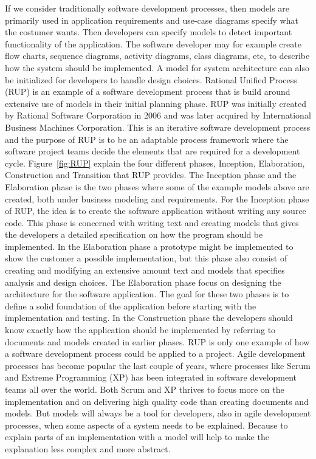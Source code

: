 If we consider traditionally software development processes, then models are
primarily used in application requirements and use-case diagrams specify what 
the costumer wants. Then developers can specify models to detect important
functionality of the application. The software developer may for example create
flow charts, sequence diagrams, activity diagrams, class diagrams, etc, to
describe how the system should be implemented. A model for system architecture
can also be initialized for developers to handle design choices. Rational
Unified Process\cite{Rational1998} (RUP) is an example of a software
development process that is build around extensive use of models in their
initial planning phase. RUP was initially created by Rational Software
Corporation\cite{IBMRational} in 2006 and was later acquired by International
Business Machines Corporation\cite{IBM}. This is an iterative software
development process and the purpose of RUP is to be an adaptable process
framework where the software project teams decide the elements that are
required for a development cycle. Figure~\ref{fig:RUP} explain the four
different phases, Inception, Elaboration, Construction and Transition that RUP
provides. The Inception phase and the Elaboration phase is the two phases where
some of the example models above are created, both under business modeling and
requirements. For the Inception phase of RUP, the idea is to create the
software application without writing any source code. This phase is  concerned
with writing text and creating models that gives the developers a detailed
specification on how the program should be implemented. In the Elaboration
phase a prototype might be implemented to show the customer a possible
implementation, but this phase also consist of creating and modifying an
extensive amount text and models that specifies analysis and design choices.
The Elaboration phase focus on designing the architecture for the software
application. The goal for these two phases is to define a solid foundation of
the application before starting with the implementation and testing. In the
Construction phase the developers should know exactly how the application
should be implemented by referring to documents and models created in earlier
phases. RUP is only one example of how a software development process could be
applied to a project. Agile development processes has become popular the last
couple of years, where processes like Scrum\cite{Schwaber2001} and Extreme
Programming\cite{Beck1999} (XP) has been integrated in software development
teams all over the world. Both Scrum and XP thrives to focus more on the
implementation and on delivering high quality code than creating documents and
models. But models will always be a tool for developers, also in agile
development processes, when some aspects of a system needs to be explained.
Because to explain parts of an implementation with a model will help to make the
explanation less complex and more abstract. 

